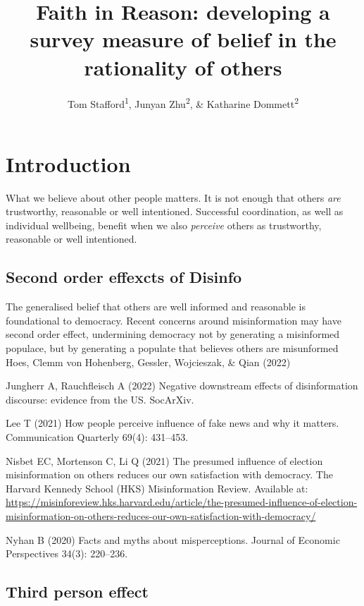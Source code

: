 \documentclass[
  ,jou,floatsintext]{apa6}
\title{Faith in Reason: developing a survey measure of belief in the rationality of others}
\author{Tom Stafford\textsuperscript{1}, Junyan Zhu\textsuperscript{2}, \& Katharine Dommett\textsuperscript{2}}
\date{}
\affiliation{\vspace{0.5cm}\textsuperscript{1} Department of Psychology, University of Sheffield, UK\\\textsuperscript{2} Department of Politics and International Relations, University of Sheffield, UK}
\begin{document}
\maketitle

\hypertarget{introduction}{%
\section{Introduction}\label{introduction}}

What we believe about other people matters. It is not enough that others \emph{are} trustworthy, reasonable or well intentioned. Successful coordination, as well as individual wellbeing, benefit when we also \emph{perceive} others as trustworthy, reasonable or well intentioned.

\hypertarget{second-order-effexcts-of-disinfo}{%
\subsection{Second order effexcts of Disinfo}\label{second-order-effexcts-of-disinfo}}

The generalised belief that others are well informed and reasonable is foundational to democracy. Recent concerns around misinformation may have second order effect, undermining democracy not by generating a misinformed populace, but by generating a populate that believes others are misunformed Hoes, Clemm von Hohenberg, Gessler, Wojcieszak, \& Qian (2022)

Jungherr A, Rauchfleisch A (2022) Negative downstream effects of disinformation discourse: evidence from the US. SocArXiv.

Lee T (2021) How people perceive influence of fake news and why it matters. Communication Quarterly 69(4): 431--453.

Nisbet EC, Mortenson C, Li Q (2021) The presumed influence of election misinformation on others reduces our own satisfaction with democracy. The Harvard Kennedy School (HKS) Misinformation Review. Available at: \url{https://misinforeview.hks.harvard.edu/article/the-presumed-influence-of-election-misinformation-on-others-reduces-our-own-satisfaction-with-democracy/}

Nyhan B (2020) Facts and myths about misperceptions. Journal of Economic Perspectives 34(3): 220--236.

\hypertarget{third-person-effect}{%
\subsection{Third person effect}\label{third-person-effect}}
\end{document}
